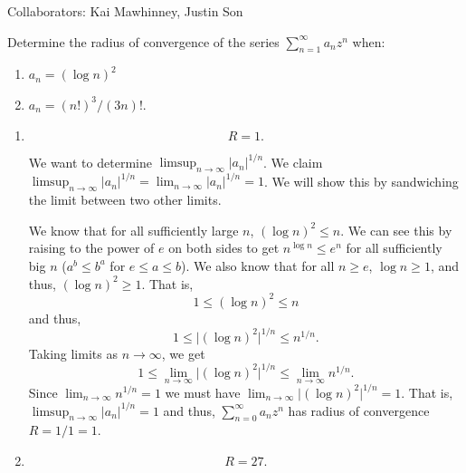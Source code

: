 \documentclass[12 pt, letterpaper]{hmcpset}
\begin{document}
Collaborators: Kai Mawhinney, Justin Son

\begin{problem}[16.]
	Determine the radius of convergence of the series $\sum_{n = 1}^{\infty} a_{n} z^{n}$ when:
	\begin{enumerate}
		\item $a_{n} = (\log n)^{2}$ 
		\item $a_{n} = (n!)^{3}/(3n)!$.
	\end{enumerate}
\end{problem}

\begin{solution}
	\begin{enumerate}
		\item
			\[
				\boxed{
					R = 1.
				}
			\]

			We want to determine $\limsup_{n \to \infty} \lvert a_{n} \rvert^{1/n}$. We claim $\limsup_{n \to \infty} \lvert a_{n} \rvert^{1/n} = \lim_{n \to \infty} \lvert a_{n} \rvert^{1/n} = 1$. We will show this by sandwiching the limit between two other limits.

			We know that for all sufficiently large $n$, $(\log n)^{2} \le n$. We can see this by raising to the power of $e$ on both sides to get $n^{\log n} \le e^{n}$ for all sufficiently big $n$ ($a^{b} \le b^{a}$ for $e \le a \le b$). We also know that for all $n \ge e$, $\log n \ge 1$, and thus, $(\log n)^{2} \ge 1$. That is,
			\[
				1 \le (\log n)^{2} \le n
			\]
			and thus,
			\[
				1 \le \lvert (\log n)^2 \rvert^{1 / n} \le n^{1/n}.
			\]
			Taking limits as $n \to \infty$, we get
			\[
				1 \le \lim_{n \to \infty} \lvert (\log n)^{2} \rvert^{1 / n} \le \lim_{n \to \infty} n^{1/n}.
			\]
			Since $\lim_{n \to \infty} n^{1/n} = 1$ we must have $\lim_{n \to \infty} \lvert (\log n)^{2} \rvert^{1/n} = 1$. That is, $\limsup_{n \to \infty} \lvert a_{n} \rvert^{1/n} = 1$ and thus, $\sum_{n = 0}^{\infty} a_{n} z^{n}$ has radius of convergence $R = 1/1 = 1$.
		\item
			\[
				\boxed{
					R = 27.
				}
			\]


\end{enumerate}
\end{solution}
\end{document}
